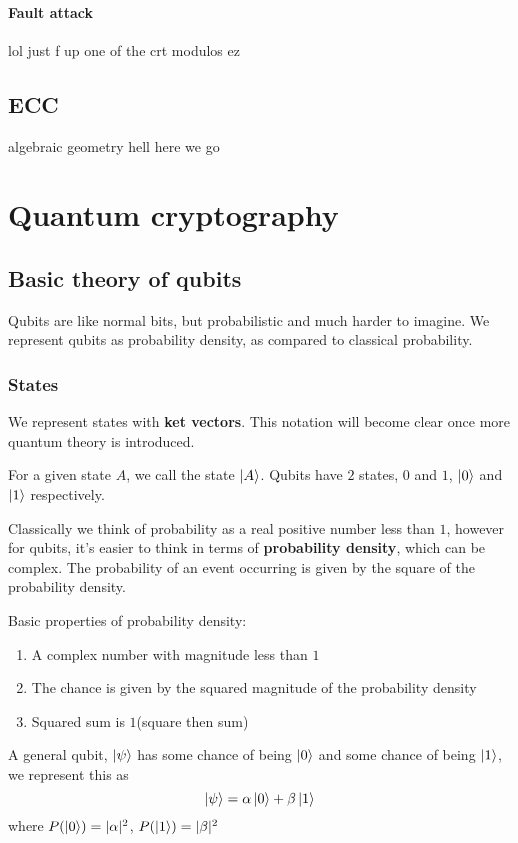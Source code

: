 \documentclass{report}
\begin{document}
\subsection{Fault attack}
lol just f up one of the crt modulos ez
\chapter{ECC}
algebraic geometry hell here we go
\part{Quantum cryptography}
\chapter{Basic theory of qubits}
Qubits are like normal bits, but probabilistic and much harder to imagine. We represent qubits as probability density, as compared to classical probability.

\section{States}

We represent states with \textbf{ket vectors}. This notation will become clear once more quantum theory is introduced.

For a given state $A$, we call the state $\ket{A}$. Qubits have $2$ states, $0$ and $1$, $\ket{0}$ and $\ket{1}$ respectively.

Classically we think of probability as a real positive number less than $1$, however for qubits, it's easier to think in terms of \textbf{probability density}, which can be complex. The probability of an event occurring is given by the square of the probability density.

Basic properties of probability density:
\begin{enumerate}
	\item A complex number with magnitude less than $1$
	\item The chance is given by the squared magnitude of the probability density
	\item Squared sum is $1$(square then sum)
\end{enumerate}

A general qubit, $\ket{\psi}$ has some chance of being $\ket{0}$ and some chance of being $\ket{1}$, we represent this as 
$$\ket{\psi}=\alpha\ket{0}+\beta\ket{1}$$
where $P(\ket{0})=|\alpha|^2$, $P(\ket{1})=|\beta|^2$
\end{document}
